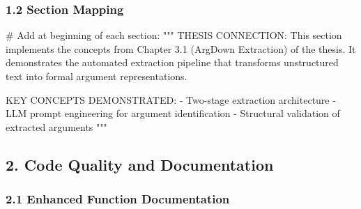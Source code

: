 \documentclass[
  11pt,
  letterpaper,
]{book}
\newenvironment{Shaded}{\begin{snugshade}}{\end{snugshade}}
\newcommand{\CommentTok}[1]{\textcolor[rgb]{0.37,0.37,0.37}{#1}}
\begin{document}
\subsubsection{1.2 Section Mapping}\label{section-mapping}

\begin{Shaded}
\begin{Highlighting}[]
\CommentTok{\# Add at beginning of each section:}
\CommentTok{"""}
\CommentTok{THESIS CONNECTION: This section implements the concepts from Chapter 3.1 }
\CommentTok{(ArgDown Extraction) of the thesis. It demonstrates the automated extraction }
\CommentTok{pipeline that transforms unstructured text into formal argument representations.}

\CommentTok{KEY CONCEPTS DEMONSTRATED:}
\CommentTok{{-} Two{-}stage extraction architecture}
\CommentTok{{-} LLM prompt engineering for argument identification  }
\CommentTok{{-} Structural validation of extracted arguments}
\CommentTok{"""}
\end{Highlighting}
\end{Shaded}

\subsection{2. Code Quality and
Documentation}\label{code-quality-and-documentation}

\subsubsection{2.1 Enhanced Function
Documentation}\label{enhanced-function-documentation}
\end{document}
